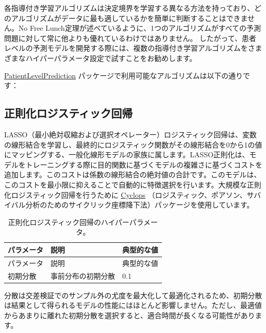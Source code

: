 \documentclass[
  11pt]{book}
\theoremstyle{definition}
\theoremstyle{definition}
\theoremstyle{definition}
\theoremstyle{definition}
\theoremstyle{remark}
\begin{document}
各指導付き学習アルゴリズムは決定境界を学習する異なる方法を持っており、どのアルゴリズムがデータに最も適しているかを簡単に判断することはできません。No Free Lunch定理が述べているように、1つのアルゴリズムがすべての予測問題に対して常に他よりも優れているわけではありません。 したがって、患者レベルの予測モデルを開発する際には、複数の指導付き学習アルゴリズムをさまざまなハイパーパラメータ設定で試すことをお勧めします。

\href{https://ohdsi.github.io/PatientLevelPrediction/}{PatientLevelPrediction} パッケージで利用可能なアルゴリズムは以下の通りです：

\subsection{正則化ロジスティック回帰}\label{ux6b63ux5247ux5316ux30edux30b8ux30b9ux30c6ux30a3ux30c3ux30afux56deux5e30}

LASSO（最小絶対収縮および選択オペレーター）ロジスティック回帰は、変数の線形結合を学習し、最終的にロジスティック関数がその線形結合を0から1の値にマッピングする、一般化線形モデルの家族に属します。LASSO正則化は、モデルをトレーニングする際に目的関数に基づくモデルの複雑さに基づくコストを追加します。このコストは係数の線形結合の絶対値の合計です。このモデルは、このコストを最小限に抑えることで自動的に特徴選択を行います。大規模な正則化ロジスティック回帰を行うために \href{https://ohdsi.github.io/Cyclops/}{Cyclops} （ロジスティック、ポアソン、サバイバル分析のためのサイクリック座標降下法）パッケージを使用しています。    

\begin{longtable}[]{@{}lll@{}}
\caption{\label{tab:lassoParameters} 正則化ロジスティック回帰のハイパーパラメータ。}\tabularnewline
\toprule\noalign{}
パラメータ & 説明 & 典型的な値 \\
\midrule\noalign{}
\endfirsthead
\toprule\noalign{}
パラメータ & 説明 & 典型的な値 \\
\midrule\noalign{}
\endhead
\bottomrule\noalign{}
\endlastfoot
初期分散 & 事前分布の初期分散 & 0.1 \\
\end{longtable}

分散は交差検証でのサンプル外の尤度を最大化して最適化されるため、初期分散は結果として得られるモデルの性能にはほとんど影響しません。ただし、最適値からあまりに離れた初期分散を選択すると、適合時間が長くなる可能性があります。  
\end{document}
